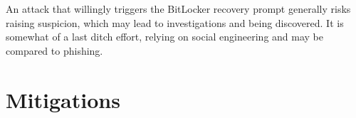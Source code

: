 An attack that willingly triggers the BitLocker recovery prompt generally risks raising suspicion, which may lead to investigations and being discovered.
It is somewhat of a last ditch effort, relying on social engineering and may be compared to phishing.
















\section{Mitigations}



